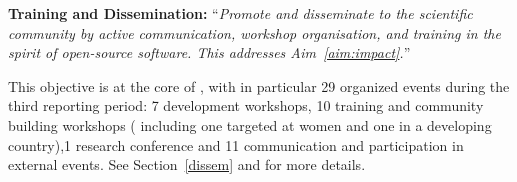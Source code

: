\begin{compactenum}[\bf {Obj} 1\rm]
\item \label{objective:disseminate}
  \textbf{Training and Dissemination:}
  ``\emph{Promote and disseminate
    \ODK to the scientific community by active communication,
    workshop organisation, and training in the spirit of open-source
    software. This addresses Aim~\ref{aim:impact}.}''

  This objective is at the core of , with in particular
  29 organized events during the third reporting period: 7 development workshops, 10 training and community building
  workshops ( including one targeted at women and one in a developing country),1 research conference 
  and 11 communication and participation in external events. See
  Section~\ref{dissem} and  for more
  details.
\end{compactenum}


